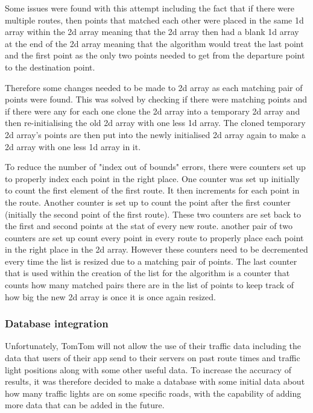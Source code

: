 \documentclass[12pt,a4paper]{article}
\begin{document}
Some issues were found with this attempt including the fact that if there were multiple routes, then points that matched each other were placed in the same 1d array within the 2d array meaning that the 2d array then had a blank 1d array at the end of the 2d array meaning that the algorithm would treat the last point and the first point as the only two points needed to get from the departure point to the destination point. 

Therefore some changes needed to be made to 2d array as each matching pair of points were found. This was solved by checking if there were matching points and if there were any for each one clone the 2d array into a temporary 2d array and then re-initialising the old 2d array with one less 1d array. The cloned temporary 2d array's points are then put into the newly initialised 2d array again to make a 2d array with one less 1d array in it.

To reduce the number of "index out of bounds" errors, there were counters set up to properly index each point in the right place. One counter was set up initially to count the first element of the first route. It then increments for each point in the route. Another counter is set up to count the point after the first counter (initially the second point of the first route). These two counters are set back to the first and second points at the stat of every new route. another pair of two counters are set up count every point in every route to properly place each point in the right place in the 2d array. However these counters need to be decremented every time the list is resized due to a matching pair of points. The last counter that is used within the creation of the list for the algorithm is a counter that counts how many matched pairs there are in the list of points to keep track of how big the new 2d array is once it is once again resized.

\subsubsection{Database integration}
Unfortunately, TomTom will not allow the use of their traffic data including the data that users of their app send to their servers on past route times and traffic light positions along with some other useful data. To increase the accuracy of results, it was therefore decided to make a database with some initial data about how many traffic lights are on some specific roads, with the capability of adding more data that can be added in the future.
\end{document}
